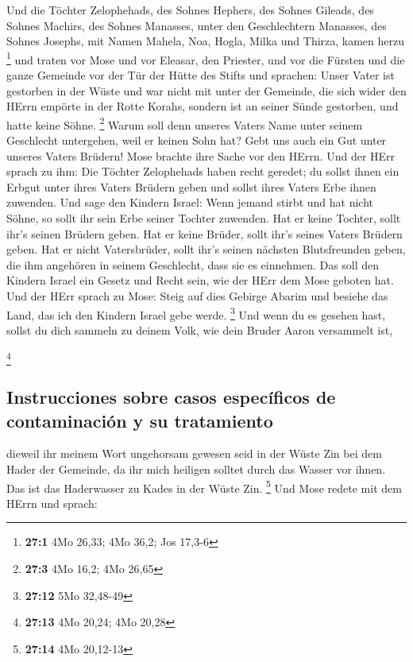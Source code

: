  Und die Töchter Zelophehads, des Sohnes Hephers, des
Sohnes Gileads, des Sohnes Machirs, des Sohnes Manasses, unter den
Geschlechtern Manasses, des Sohnes Josephs, mit Namen Mahela, Noa,
Hogla, Milka und Thirza, kamen herzu \footnote{\textbf{27:1} 4Mo 26,33;
  4Mo 36,2; Jos 17,3-6}  und traten vor Mose und vor
Eleasar, den Priester, und vor die Fürsten und die ganze Gemeinde vor
der Tür der Hütte des Stifts und sprachen:  Unser Vater
ist gestorben in der Wüste und war nicht mit unter der Gemeinde, die
sich wider den HErrn empörte in der Rotte Korahs, sondern ist an seiner
Sünde gestorben, und hatte keine Söhne. \footnote{\textbf{27:3} 4Mo
  16,2; 4Mo 26,65}  Warum soll denn unseres Vaters Name
unter seinem Geschlecht untergehen, weil er keinen Sohn hat? Gebt uns
auch ein Gut unter unseres Vaters Brüdern!  Mose brachte
ihre Sache vor den HErrn.  Und der HErr sprach zu ihm:
 Die Töchter Zelophehads haben recht geredet; du sollst
ihnen ein Erbgut unter ihres Vaters Brüdern geben und sollst ihres
Vaters Erbe ihnen zuwenden.  Und sage den Kindern Israel:
Wenn jemand stirbt und hat nicht Söhne, so sollt ihr sein Erbe seiner
Tochter zuwenden.  Hat er keine Tochter, sollt ihr's
seinen Brüdern geben.  Hat er keine Brüder, sollt ihr's
seines Vaters Brüdern geben.  Hat er nicht Vatersbrüder,
sollt ihr's seinen nächsten Blutsfreunden geben, die ihm angehören in
seinem Geschlecht, dass sie es einnehmen. Das soll den Kindern Israel
ein Gesetz und Recht sein, wie der HErr dem Mose geboten hat.
 Und der HErr sprach zu Mose: Steig auf dies Gebirge
Abarim und besiehe das Land, das ich den Kindern Israel gebe werde.
\footnote{\textbf{27:12} 5Mo 32,48-49}  Und wenn du es
gesehen hast, sollst du dich sammeln zu deinem Volk, wie dein Bruder
Aaron versammelt ist,

\footnote{\textbf{27:13} 4Mo 20,24; 4Mo 20,28}

\hypertarget{instrucciones-sobre-casos-especuxedficos-de-contaminaciuxf3n-y-su-tratamiento}{%
\subsection{Instrucciones sobre casos específicos de contaminación y su
tratamiento}\label{instrucciones-sobre-casos-especuxedficos-de-contaminaciuxf3n-y-su-tratamiento}}

 dieweil ihr meinem Wort ungehorsam gewesen seid in der
Wüste Zin bei dem Hader der Gemeinde, da ihr mich heiligen solltet durch
das Wasser vor ihnen. Das ist das Haderwasser zu Kades in der Wüste Zin.
\footnote{\textbf{27:14} 4Mo 20,12-13}  Und Mose redete
mit dem HErrn und sprach:

